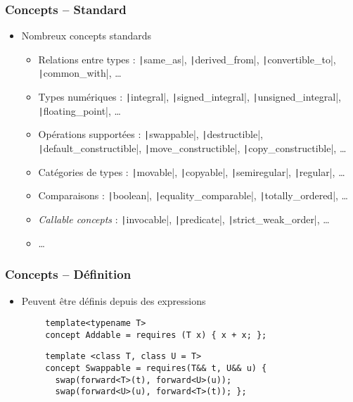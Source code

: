 \documentclass[C++.tex]{subfiles}
\begin{document}
\begin{frame}[fragile]
	\frametitle{Concepts -- Standard}
	\begin{itemize}
		\item Nombreux concepts standards
		\begin{itemize}
			\item Relations entre types : \texttt|same_as|, \texttt|derived_from|, \texttt|convertible_to|, \texttt|common_with|, \ldots{}
			\item Types numériques : \texttt|integral|, \texttt|signed_integral|, \texttt|unsigned_integral|, \texttt|floating_point|, \ldots{}
			\item Opérations supportées : \texttt|swappable|, \texttt|destructible|, \texttt|default_constructible|, \texttt|move_constructible|, \texttt|copy_constructible|, \ldots{}
			\item Catégories de types : \texttt|movable|, \texttt|copyable|, \texttt|semiregular|, \texttt|regular|, \ldots{}


			\item Comparaisons : \texttt|boolean|, \texttt|equality_comparable|, \texttt|totally_ordered|, \ldots{}
			\item \textit{Callable concepts} : \texttt|invocable|, \texttt|predicate|, \texttt|strict_weak_order|, \ldots{}


			\item \ldots{}
		\end{itemize}
	\end{itemize}
\end{frame}

\begin{frame}[fragile]
	\frametitle{Concepts -- Définition}
	\begin{itemize}
		\item Peuvent être définis depuis des expressions
	\end{itemize}

	\begin{verbatim}
		template<typename T>
		concept Addable = requires (T x) { x + x; };
	\end{verbatim}

	\begin{verbatim}
		template <class T, class U = T>
		concept Swappable = requires(T&& t, U&& u) {
		  swap(forward<T>(t), forward<U>(u));
		  swap(forward<U>(u), forward<T>(t)); };
	\end{verbatim}
\end{frame}
\end{document}
